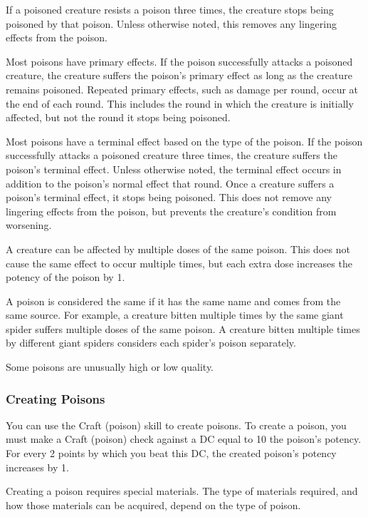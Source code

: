 If a poisoned creature resists a poison three times, the creature stops being poisoned by that poison.
Unless otherwise noted, this removes any lingering effects from the poison.

Most poisons have primary effects.
If the poison successfully attacks a poisoned creature, the creature suffers the poison's primary effect as long as the creature remains poisoned.
Repeated primary effects, such as damage per round, occur at the end of each round.
This includes the round in which the creature is initially affected, but not the round it stops being poisoned.

Most poisons have a terminal effect based on the type of the poison.
If the poison successfully attacks a poisoned creature three times, the creature suffers the poison's terminal effect.
Unless otherwise noted, the terminal effect occurs in addition to the poison's normal effect that round.
Once a creature suffers a poison's terminal effect, it stops being poisoned.
This does not remove any lingering effects from the poison, but prevents the creature's condition from worsening.

A creature can be affected by multiple doses of the same poison.
This does not cause the same effect to occur multiple times, but each extra dose increases the potency of the poison by 1.

A poison is considered the same if it has the same name and comes from the same source.
For example, a creature bitten multiple times by the same giant spider suffers multiple doses of the same poison.
A creature bitten multiple times by different giant spiders considers each spider's poison separately.

 Some poisons are unusually high or low quality.

\subsubsection{Creating Poisons}\label{Creating Poisons}

You can use the Craft (poison) skill to create poisons.
To create a poison, you must make a Craft (poison) check against a DC equal to 10 \add the poison's potency.
For every 2 points by which you beat this DC, the created poison's potency increases by 1.

Creating a poison requires special materials.
The type of materials required, and how those materials can be acquired, depend on the type of poison.

